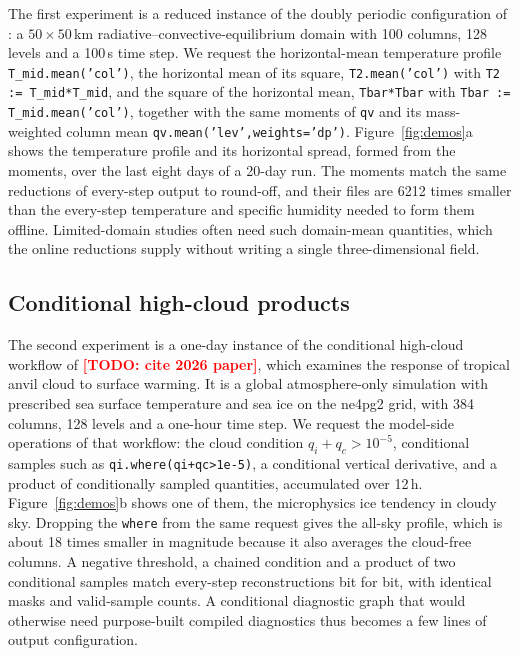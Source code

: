 \documentclass[gmd, manuscript]{copernicus}
\newcommand{\bk}{\discretionary{}{}{}}
\newcommand{\todo}[1]{\textcolor{red}{\textbf{[TODO: #1]}}}
\begin{document}
The first experiment is a reduced instance of the doubly periodic configuration of \citet{bogenschutz_high_2025}: a $50\times50$\,km radiative--convective-equilibrium domain with 100 columns, 128 levels and a 100\,s time step. We request the horizontal-mean temperature profile \texttt{T\_mid.\bk mean('col')}, the horizontal mean of its square, \texttt{T2.\bk mean('col')} with \texttt{T2 := T\_mid*T\_mid}, and the square of the horizontal mean, \texttt{Tbar*Tbar} with \texttt{Tbar := T\_mid.\bk mean('col')}, together with the same moments of \texttt{qv} and its mass-weighted column mean \texttt{qv.\bk mean('lev',\bk weights='dp')}. Figure~\ref{fig:demos}a shows the temperature profile and its horizontal spread, formed from the moments, over the last eight days of a 20-day run. The moments match the same reductions of every-step output to round-off, and their files are 6212 times smaller than the every-step temperature and specific humidity needed to form them offline. Limited-domain studies often need such domain-mean quantities, which the online reductions supply without writing a single three-dimensional field.

\subsection{Conditional high-cloud products}
\label{sec:cess2}

The second experiment is a one-day instance of the conditional high-cloud workflow of \citet{beydoun_dissecting_2021} \todo{cite 2026 paper}, which examines the response of tropical anvil cloud to surface warming. It is a global atmosphere-only simulation with prescribed sea surface temperature and sea ice on the ne4pg2 grid, with 384 columns, 128 levels and a one-hour time step.
We request the model-side operations of that workflow: the cloud condition $q_i+q_c>10^{-5}$, conditional samples such as \texttt{qi.where(qi+qc>1e-5)}, a conditional vertical derivative, and a product of conditionally sampled quantities, accumulated over 12\,h. Figure~\ref{fig:demos}b shows one of them, the microphysics ice tendency in cloudy sky. Dropping the \texttt{where} from the same request gives the all-sky profile, which is about 18 times smaller in magnitude because it also averages the cloud-free columns. A negative threshold, a chained condition and a product of two conditional samples match every-step reconstructions bit for bit, with identical masks and valid-sample counts. A conditional diagnostic graph that would otherwise need purpose-built compiled diagnostics thus becomes a few lines of output configuration.
\end{document}
